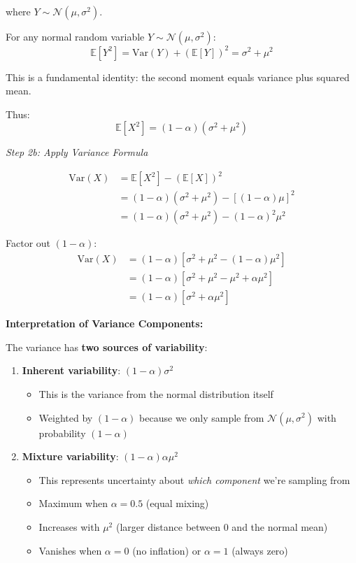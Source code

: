\documentclass[12pt]{article}
\begin{document}
\begin{explanation}
where \(Y \sim \mathcal{N}(\mu, \sigma^2)\).

For any normal random variable \(Y \sim \mathcal{N}(\mu, \sigma^2)\):
\[
\mathbb{E}[Y^2] = \text{Var}(Y) + (\mathbb{E}[Y])^2 = \sigma^2 + \mu^2
\]

This is a fundamental identity: the second moment equals variance plus squared mean.

Thus:
\[
\mathbb{E}[X^2] = (1-\alpha)(\sigma^2 + \mu^2)
\]

\textit{Step 2b: Apply Variance Formula}

\begin{align*}
\text{Var}(X) &= \mathbb{E}[X^2] - (\mathbb{E}[X])^2 \\
&= (1-\alpha)(\sigma^2 + \mu^2) - [(1-\alpha)\mu]^2 \\
&= (1-\alpha)(\sigma^2 + \mu^2) - (1-\alpha)^2\mu^2
\end{align*}

Factor out \((1-\alpha)\):
\begin{align*}
\text{Var}(X) &= (1-\alpha)[\sigma^2 + \mu^2 - (1-\alpha)\mu^2] \\
&= (1-\alpha)[\sigma^2 + \mu^2 - \mu^2 + \alpha\mu^2] \\
&= (1-\alpha)[\sigma^2 + \alpha\mu^2]
\end{align*}

\textbf{Interpretation of Variance Components:}

The variance has \textbf{two sources of variability}:

\begin{enumerate}
    \item \textbf{Inherent variability}: \((1-\alpha)\sigma^2\)
    \begin{itemize}
        \item This is the variance from the normal distribution itself
        \item Weighted by \((1-\alpha)\) because we only sample from \(\mathcal{N}(\mu, \sigma^2)\) with probability \((1-\alpha)\)
    \end{itemize}

    \item \textbf{Mixture variability}: \((1-\alpha)\alpha\mu^2\)
    \begin{itemize}
        \item This represents uncertainty about \textit{which component} we're sampling from
        \item Maximum when \(\alpha = 0.5\) (equal mixing)
        \item Increases with \(\mu^2\) (larger distance between 0 and the normal mean)
        \item Vanishes when \(\alpha = 0\) (no inflation) or \(\alpha = 1\) (always zero)
    \end{itemize}
\end{enumerate}


\end{explanation}
\end{document}
